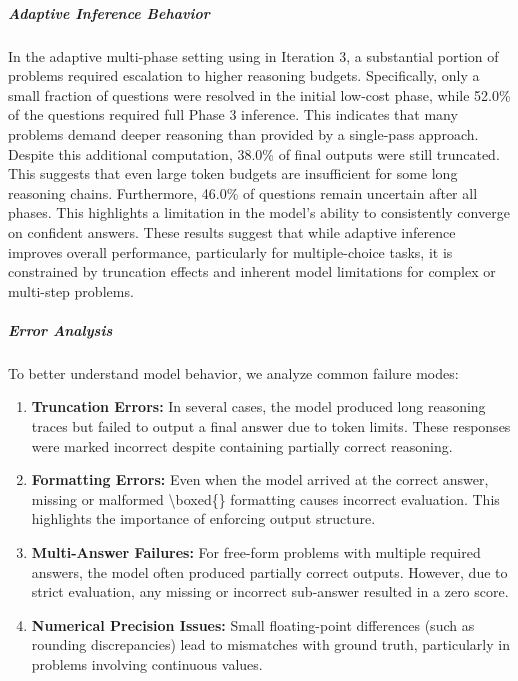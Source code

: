 \documentclass{article}
\begin{document}
\subparagraph{Adaptive Inference Behavior} In the adaptive multi-phase setting using in Iteration 3, a substantial portion of problems required escalation to higher reasoning budgets. Specifically, only a small fraction of questions were resolved in the initial low-cost phase, while 52.0\% of the questions required full Phase 3 inference. This indicates that many problems demand deeper reasoning than provided by a single-pass approach. Despite this additional computation, 38.0\% of final outputs were still truncated. This suggests that even large token budgets are insufficient for some long reasoning chains. Furthermore, 46.0\% of questions remain uncertain after all phases. This highlights a limitation in the model's ability to consistently converge on confident answers. These results suggest that while adaptive inference improves overall performance, particularly for multiple-choice tasks, it is constrained by truncation effects and inherent model limitations for complex or multi-step problems.

\subparagraph{Error Analysis} To better understand model behavior, we analyze common failure modes:
\begin{enumerate}
    \item \textbf{Truncation Errors:} In several cases, the model produced long reasoning traces but failed to output a final answer due to token limits. These responses were marked incorrect despite containing partially correct reasoning.
    \item \textbf{Formatting Errors:} Even when the model arrived at the correct answer, missing or malformed \textbackslash boxed\{\} formatting causes incorrect evaluation. This highlights the importance of enforcing output structure.
    \item \textbf{Multi-Answer Failures:} For free-form problems with multiple required answers, the model often produced partially correct outputs. However, due to strict evaluation, any missing or incorrect sub-answer resulted in a zero score.
    \item \textbf{Numerical Precision Issues:} Small floating-point differences (such as rounding discrepancies) lead to mismatches with ground truth, particularly in problems involving continuous values.
\end{enumerate}
\end{document}
